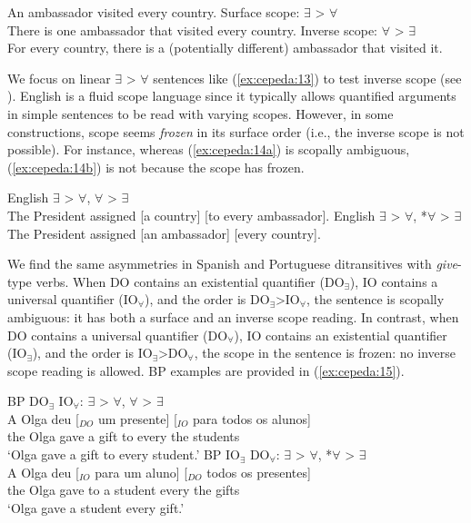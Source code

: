 \documentclass[output=paper,colorlinks,citecolor=brown]{./langscibook}
\begin{document}
\ea%
    \label{ex:cepeda:13} 
    An ambassador visited every country.
	\ea\label{ex:cepeda:13a}
	Surface scope: $\exists$ > $\forall$\\
	There is one ambassador that visited every country.
	\ex\label{ex:cepeda:13b} Inverse scope: $\forall$ > $\exists$\\
	For every country, there is a (potentially different) ambassador that visited it.
	\z
\z

We focus on linear $\exists$ > $\forall$ sentences like (\ref{ex:cepeda:13}) to test inverse scope (see \citealt{Larson2014}). English is a fluid scope language since it typically allows quantified arguments in simple sentences to be read with varying scopes. However, in some constructions, scope seems \textit{frozen} in its surface order (i.e., the inverse scope is not possible). For instance, whereas (\ref{ex:cepeda:14a}) is scopally ambiguous, (\ref{ex:cepeda:14b}) is not because the scope has frozen.

\ea%
    \label{ex:cepeda:14}
	\ea\label{ex:cepeda:14a}
	English $\exists$ > $\forall$, $\forall$ > $\exists$\\
	The President assigned [a country] [to every ambassador].
	\ex\label{ex:cepeda:14b}
	English $\exists$ > $\forall$, *$\forall$ > $\exists$\\
	The President assigned [an ambassador] [every country].
	\z
\z

We find the same asymmetries in Spanish and Portuguese ditransitives with \textit{give}-type verbs. When DO contains an existential quantifier (DO$_∃$), IO contains a universal quantifier (IO$_∀$), and the order is DO$_∃$>IO$_∀$, the sentence is scopally ambiguous: it has both a surface and an inverse scope reading. In contrast, when DO contains a universal quantifier (DO$_∀$), IO contains an existential quantifier (IO$_∃$), and the order is IO$_∃$>DO$_∀$, the scope in the sentence is frozen: no inverse scope reading is allowed. BP examples are provided in (\ref{ex:cepeda:15}).

\ea%
    \label{ex:cepeda:15}
	\ea\label{ex:cepeda:15a}
	BP DO$_∃$ IO$_∀$: $\exists$ > $\forall$, $\forall$ > $\exists$\\
	\gll A Olga deu [$_{DO}$ um presente] [$_{IO}$ para todos os  alunos]\\
		the Olga gave \hspaceThis{[$_{DO}$} a    gift \hspaceThis{[$_{IO}$} to    every the students\\
	\glt ‘Olga gave a gift to every student.’
	\ex\label{ex:cepeda:15b}
	BP IO$_∃$  DO$_∀$: $\exists$ > $\forall$, *$\forall$ > $\exists$\\
	\gll A Olga deu [$_{IO}$ para um aluno] [$_{DO}$ todos os presentes]\\
		the Olga gave \hspaceThis{[$_{IO}$} to a student \hspaceThis{[$_{DO}$} every the gifts\\
	\glt ‘Olga gave a student every gift.’
	\z
\z
\end{document}
